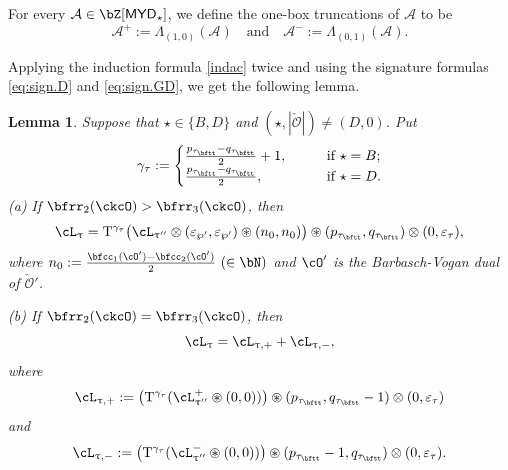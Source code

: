 \documentclass[11pt,a4paper]{amsart}
\def\MYD{{\mathsf{MYD}}}
\def\abs#1{\left|{#1}\right|}
\newcommand{\CA}{{\mathcal {A}}}
\newcommand{\CO}{{\mathcal {O}}}
\newcommand{\be}{\begin {equation}}
\newcommand{\ee}{\end {equation}}
\numberwithin{equation}{section}
\newtheorem{lem}[thm]{Lemma}
\theoremstyle{remark}
\def\uptaupp{\uptau^{\prime\prime}}
\def\maltese{\mathrm{T}}
\def\MYD{{\mathsf{MYD}}}
\def\AND{\quad\text{and}\quad}
\def\pac#1{\ac_{#1}^+}
\def\nac#1{\ac_{#1}^-}
\def\ac{\cL}
\def\lotimes{\otimes}
\begin{document}
For every  $\CA\in \bZ[\MYD_{\star}]$, we define the one-box truncations of $\CA$ to be
\[
\CA^{+} := \Lambda_{(1,0)}(\CA) \AND \CA^{-} := \Lambda_{(0,1)}(\CA).
\]

Applying the induction formula \eqref{indac} twice and using the signature formulas \eqref{eq:sign.D} and \eqref{eq:sign.GD}, we get the following lemma.
\begin{lem}\label{lem:dlift00}
 Suppose that $\star\in\{B,D\}$ and $(\star, \abs{\check \CO})\neq (D, 0)$. Put
\be\label{gammatau}
   \gamma_\tau:=\begin{cases}
   \frac{p_{\tau_\bftt}-q_{\tau_\bftt}}{2}+1, \qquad & \textrm{if $\star=B$};\\
    \frac{p_{\tau_\bftt}-q_{\tau_\bftt}}{2}, \qquad &\textrm{if $\star=D$}.
   \end{cases}
    \ee
\noindent (a)
 If  $\bfrr_{2}(\ckcO)>\bfrr_{3}(\ckcO)$, then
  \begin{equation}\label{eq:BD}
    \ac_{\uptau}= \maltese^{\gamma_\tau}\big(\ac_{\uptau''}\otimes (\varepsilon_{\wp'}, \varepsilon_{\wp'})\circledast (n_0,n_0)\big)\circledast (p_{\tau_{\bftt}},q_{\tau_{\bftt}})
    \lotimes (0,\varepsilon_{\tau}),
  \end{equation}
 where $n_0:=\frac{\bfcc_{1}(\cO')-\bfcc_{2}(\cO')}{2}\ (\in \bN)$ and $\cO'$ is the Barbasch-Vogan dual of $\check \CO'$.


\noindent (b)
 If  $\bfrr_{2}(\ckcO)=\bfrr_{3}(\ckcO)$,
  then
\be\label{decac}
    \ac_{\uptau} =
    \ac_{\uptau,+}+\ac_{\uptau,-},
\ee
    where
  \begin{equation}\label{eq:BD201}
    \ac_{\uptau,+}:=\big(\maltese^{\gamma_\tau} (\pac{\uptaupp}\circledast (0,0))\big) \circledast (p_{\tau_{\bftt}},q_{\tau_{\bftt}}-1)\lotimes(0,\varepsilon_{\tau})
    \end{equation}
    and
      \begin{equation}\label{eq:BD202}
    \ac_{\uptau,-}:= \big(\maltese^{\gamma_\tau}(\nac{\uptaupp}\circledast (0,0)) \big) \circledast (p_{\tau_{\bftt}}-1,q_{\tau_{\bftt}})
    \lotimes(0,\varepsilon_{\tau}).
  \end{equation} %
  \end{lem}
\end{document}
